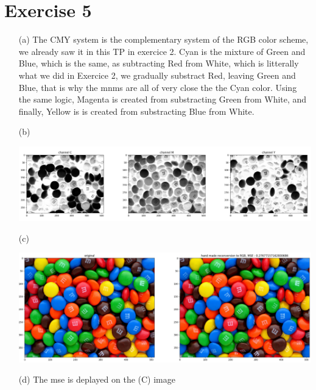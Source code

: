 \documentclass[a4paper]{article}
\begin{document}
\section*{Exercise 5}
\begin{itemize}
\item[(a)] The CMY system is the complementary system of the RGB color scheme, we already saw it in this TP in exercice 2. Cyan is the mixture of Green and Blue, which is the same, as subtracting Red from White, which is litterally what we did in Exercice 2, we gradually substract Red, leaving Green and Blue, that is why the mnms are all of very close the the Cyan color. Using the same logic, Magenta is created from substracting Green from White, and finally, Yellow is is created from substracting Blue from White.
\item[(b)]
\begin{center}
\includegraphics[width=1\textwidth]{images/exercice_5_b.PNG}\\[1cm] 
\end{center}
\item[(c)]
\begin{center}
\includegraphics[width=1\textwidth]{images/exercice_5_c.PNG}\\[1cm] 
\end{center}
\item[(d)] The mse is deplayed on the (C) image 
\end{itemize}

\end{document}
